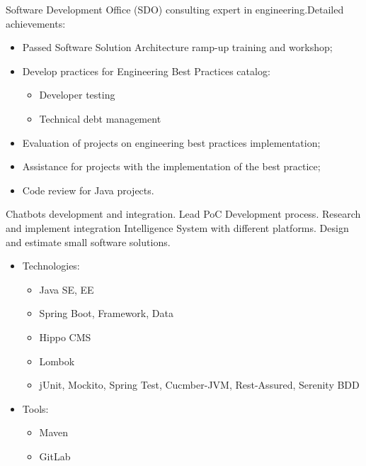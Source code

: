 \documentclass[11pt, a4paper]{moderncv}
\begin{document}
{Software Development Office (SDO) consulting expert in engineering.\newline{}Detailed achievements:
\begin{itemize}
\item Passed Software Solution Architecture ramp-up training and workshop;
\item Develop practices for Engineering Best Practices catalog:
\begin{itemize}
\item Developer testing
\item Technical debt management
\end{itemize}
\item Evaluation of projects on engineering best practices implementation;
\item Assistance for projects with the implementation of the best practice;
\item Code review for Java projects.
\end{itemize}}

{Chatbots development and integration. Lead PoC Development process. Research and implement integration Intelligence System with different platforms. Design and estimate small software solutions.
\begin{itemize}
\item Technologies:
\begin{itemize}
\item Java SE, EE
\item Spring Boot, Framework, Data
\item Hippo CMS
\item Lombok
\item jUnit, Mockito, Spring Test, Cucmber-JVM, Rest-Assured, Serenity BDD  
\end{itemize}
\item Tools:
\begin{itemize}
\item Maven
\item GitLab 
\end{itemize}
\end{itemize}}
\end{document}
